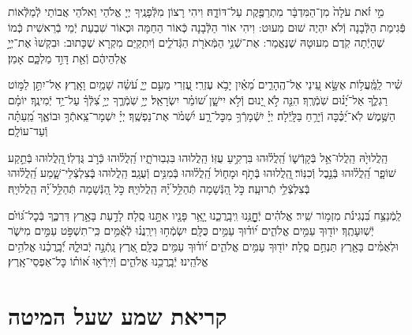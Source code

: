 \documentclass[twoside, openany, parskip=half, 11pt]{book}
\begin{document}
מִ֣י זֹ֗את עֹלָה֙ מִן־הַמִּדְבָּ֔ר מִתְרַפֶּ֖קֶת עַל־דּוֹדָ֑הּ׃
וִיהִי רָצוֹן מִלְּֿפָנֶֽיךָ יְיָ אֱלֹהַי וֵאלֹהֵי אֲבוֹתַי לְֿמַלְּֿאוֹת פְּֿגִימַת הַלְּֿבָנָה וְֿלֹא יִהְיֶה שׁוּם מִעוּט: וִיהִי אוֹר הַלְּֿבָנָה כְּֿאוֹר הַחַמָּה וּכְאוֹר שִׁבְעַת יְֿמֵי בְֿרֵאשִׁית כְּֿמוֹ שֶׁהָיְֿתָה קֹֽדֶם מִעוּטָהּ שֶׁנֶּאֱמַר:
אֶת־שְֿׁנֵ֥י הַמְּֿאֹרֹ֖ת הַגְּֿדֹלִ֑ים וְֿיִתְקַיַּם מִקְרָא שֶׁכָּתוּב: וּבִקְשׁוּ֙ אֶת־יְיָ֣ אֱלֹֽהֵיהֶ֔ם וְֿאֵ֖ת דָּוִ֣ד מַלְכָּ֑ם אָמֵן׃


שִׁ֗יר לַֽמַּֽ֫עֲל֥וֹת אֶשָּׂ֣א עֵ֭ינַי אֶל־הֶֽהָרִ֑ים מֵ֝אַ֗יִן יָבֹ֥א עֶזְרִֽי׃ עֶ֭זְרִי מֵעִ֣ם יְיָ֑ עֹ֝שֵׂ֗ה שָׁמַ֥יִם וָאָֽרֶץ׃ אַל־יִתֵּ֣ן לַמּ֣וֹט רַגְלֶ֑ךָ אַל־יָ֝נ֗וּם שֹֽׁמְֿרֶֽךָ׃ הִנֵּ֤ה לֹ֣א יָ֭נוּם וְֿלֹ֣א יִישָׁ֑ן שׁ֝וֹמֵ֗ר יִשְׂרָאֵֽל׃ יְיָ֥ שֹֽׁמְֿרֶ֑ךָ יְיָ֥ צִ֝לְּֿךָ֗ עַל־יַ֥ד יְֿמִינֶֽךָ׃ יוֹמָ֗ם הַשֶּׁ֥מֶשׁ לֹֽא־יַ֝כֶּ֗כָּה וְֿיָרֵ֥חַ בַּלָּֽיְֿלָה׃ יְיָ֗ יִשְֿׁמָרְֿךָ֥ מִכׇּל־רָ֑ע יִ֝שְׁמֹ֗ר אֶת־נַפְשֶֽׁךָ׃ יְיָ֗ יִשְׁמָר־צֵֽאתְֿךָ֥ וּבוֹאֶ֑ךָ מֵֽ֝עַתָּ֗ה וְֿעַד־עוֹלָֽם׃

הַֽלֲלוּיָ֙הּ הַֽלֲלוּ־אֵ֥ל בְּֿקָדְֿשׁ֑וֹ הַֽ֝לֲל֗וּהוּ בִּרְקִ֥יעַ עֻזּֽוֹ׃
הַֽלֲלוּהוּ בִּגְבֽוּרֹתָ֑יו הַֽ֝לֲל֗וּהוּ כְּֿרֹ֣ב גֻּדְלֽוֹ׃
֖הַֽלֲלוּהוּ בְּֿתֵ֣קַע שׁוֹפָ֑ר הַֽ֝לֲל֗וּהוּ בְּֿנֵ֣בֶל וְֿכִנּֽוֹר׃
֖הַֽלֲלוּהוּ בְּֿתֹ֣ף וּמָח֑וֹל הַֽ֝לֲל֗וּהוּ בְּֿמִנִּ֥ים וְֿעֻגָֽב׃
הַֽלֲלוּהוּ בְּֽֿצִלְצְֿלֵי־שָׁ֑מַע הַֽ֝לֲל֗וּהוּ בְּֽֿצִלְצְֿלֵ֥י תְֿרוּעָֽה׃
כֹּ֣ל הַ֭נְּֿשָׁמָה תְּֿהַלֵּ֥ל ֝יָ֗הּ הַֽלֲלוּיָֽהּ׃
כֹּ֣ל הַ֭נְּֿשָׁמָה תְּֿהַלֵּ֥ל ֝יָ֗הּ הַֽלֲלוּיָֽהּ׃

\enlargethispage{\baselineskip}
לַֽמְֿנַצֵּ֥ח
בִּ֝נְגִינֹ֗ת מִזְמ֥וֹר שִֽׁיר׃ אֱלֹהִ֗ים יְֿחׇׇׇׇׇׇׇׇָנֵּ֥נוּ וִֽיבָֽרֲכֵ֑נוּ יָ֤אֵ֥ר פָּנָ֖יו אִתָּ֣נוּ סֶֽלָה׃ לָדַ֣עַת בָּאָ֣רֶץ דַּרְכֶּ֑ךָ בְּֿכׇל־גּ֝וֹיִ֗ם יְֿשֽׁוּעָתֶֽךָ׃ יוֹד֖וּךָ עַמִּ֥ים אֱלֹהִ֑ים י֝וֹד֗וּךָ עַמִּ֥ים כֻּלָּֽם׃ יִשְׂמְֿח֥וּ וִירַֽנֲנ֗וּ לְֿאֻ֫מִּ֥ים כִּֽי־תִשְׁפֹּ֣ט עַמִּ֣ים מִישֹׁ֑ר וּלְאֻמִּ֓ים בָּאָ֖רֶץ תַּנְחֵ֣ם סֶֽלָה׃ יוֹד֖וּךָ עַמִּ֥ים אֱלֹהִ֑ים י֝וֹד֗וּךָ עַמִּ֥ים כֻּלָּֽם׃ אֶ֭רֶץ נָֽתְֿנָ֣ה יְֿבוּלָ֑הּ יְֿ֝בָֽרֲכֵ֗נוּ אֱלֹהִ֥ים אֱלֹהֵֽינוּ׃ יְֿבָֽרֲכֵ֥נוּ אֱלֹהִ֑ים וְֿיִֽירְֿא֥וּ א֝וֹת֗וֹ כׇּל־אַפְסֵי־אָֽרֶץ׃


\chapter[קריאת שמע שעל המיטה]{ קריאת שמע שעל המיטה }

\shema

\veahavta
\end{document}
